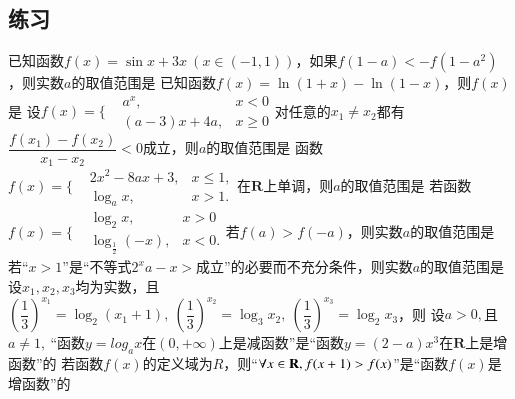\documentclass{BHCexam}
\begin{document}
\subsection{练习}
\begin{questions}
\qs 已知函数$f(x)=\sin x+3x~(x\in (-1,1))$，如果$ f(1-a)<-f(1-a^2) $，则实数$ a $的取值范围是\xx
{}
\qs 已知函数$f(x)=\ln \left(1+x\right)-\ln \left(1-x\right)$，则$f(x)$是\xx
{}
\qs 设$f(x)=\Bigg\{\begin{aligned}
&a^x,&x<0\\
&(a-3)x+4a,&x\ge 0
\end{aligned}$对任意的$ x_1\ne x_2 $都有$ \dfrac{f(x_1)-f(x_2)}{x_1-x_2}<0 $成立，则$ a $的取值范围是\xx
\onech{$ \left(0,\dfrac{1}{4}\right]$}{$ \left(0,1\right)$}{$ \left[\dfrac{1}{4},1\right)$}{$ \left(0,3\right)$}
\qs 函数$f(x)=\Bigg\{\begin{aligned}
&2x^2-8ax+3,&x\le 1,\\
&\log_ax,&x>1.
\end{aligned}$在$\mathbf{R}$上单调，则$ a $的取值范围是\xx
\onech{$ \left(0,\dfrac{1}{2}\right]$}{$ \left[\dfrac{1}{2},1\right)$}{$ \left[\dfrac{1}{2},\dfrac{5}{8}\right]$}{$ \left[\dfrac{5}{8},1\right)$}
\qs 若函数$f(x)=\Bigg\{\begin{aligned}
&\log_2x,&x>0\\
&\log_{\frac{1}{2}}(-x),&x<0.
\end{aligned}$若$ f(a)>f(-a) $，则实数$ a $的取值范围是\xx
{}
\qs 若“$ x>1 $”是“不等式$ 2^xa-x> $成立”的必要而不充分条件，则实数$ a $的取值范围是\xx
{}
\qs 设$ x_1,x_2,x_3 $均为实数，且$ \left(\dfrac{1}{3}\right)^{x_1}=\log_2\left(x_1+1\right),~\left(\dfrac{1}{3}\right)^{x_2}=\log_3x_2, ~\left(\dfrac{1}{3}\right)^{x_3}=\log_2x_3$，则\xx
{}
\qs 设$ a>0, $且$ a\ne 1,~ $“函数$y=log_ax$在$ \left(0,+\infty\right) $上是减函数”是“函数$ y=(2-a)x^3 $在$ \mathbf{R} $上是增函数”的\xx
{}
\qs 若函数$f(x)$的定义域为$ R $，则“$ \forall x\in\mathbf{R},f(x+1)>f(x) $”是“函数$ f(x) $是增函数”的\xx

\end{questions}
\end{document}
